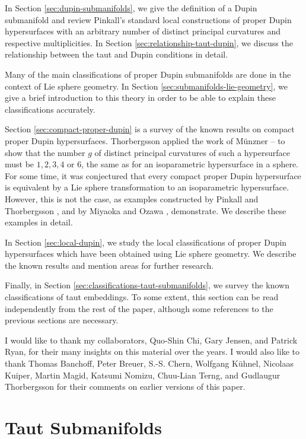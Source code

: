 \documentclass[12pt]{article}
\begin{document}
In Section \ref{sec:dupin-submanifolds}, we give the definition of a Dupin submanifold and review
Pinkall's standard local constructions of proper Dupin
hypersurfaces with an arbitrary number of distinct principal
curvatures and respective multiplicities.  In Section \ref{sec:relationship-taut-dupin}, we discuss
the relationship between the taut and Dupin conditions in
detail.

Many of the main classifications of proper Dupin submanifolds
are done in the context of Lie sphere geometry. In Section \ref{sec:submanifolds-lie-geometry},
we give a brief introduction to this theory in order
to be able to explain these classifications accurately.

Section \ref{sec:compact-proper-dupin} is a survey of the known results on compact proper
Dupin hypersurfaces.  Thorbergsson \cite{Th1} applied the
work of M\"{u}nzner \cite{Mu}--\cite{Mu2} to show that
the number $g$ of distinct principal curvatures of such a
hypersurface must be $1,2,3,4$ or 6, the same as for an isoparametric
hypersurface in a sphere.  
For some time, it was 
conjectured that every compact proper 
Dupin hypersurface is equivalent by a Lie
sphere transformation to an isoparametric hypersurface.
However, this is not the case, as examples constructed
by Pinkall and Thorbergsson \cite{PT}, and by Miyaoka and
Ozawa \cite{MO}, demonstrate.  We describe these examples in
detail.

In Section \ref{sec:local-dupin}, we study the local classifications of proper Dupin
hypersurfaces which have been obtained using Lie sphere
geometry.  We describe the known results and mention 
areas for further research.

Finally, in Section \ref{sec:classifications-taut-submanifolds}, we survey the known classifications of taut
embeddings.
To some extent, this section can be
read independently from the rest of the paper, although some references
to the previous sections are necessary.

I  would like to thank my collaborators, Quo-Shin Chi, Gary Jensen, and Patrick Ryan, for their many insights on this material over the years.
I would also like to thank Thomas Banchoff, Peter Breuer, S.-S. Chern,  Wolfgang K\"{u}hnel,  Nicolaas Kuiper,
Martin Magid, Katsumi Nomizu,
Chuu-Lian Terng,
and Gudlaugur Thorbergsson for their comments on earlier
versions of this paper.

\section{Taut Submanifolds}
\label{sec:taut-submanifolds}
\end{document}

